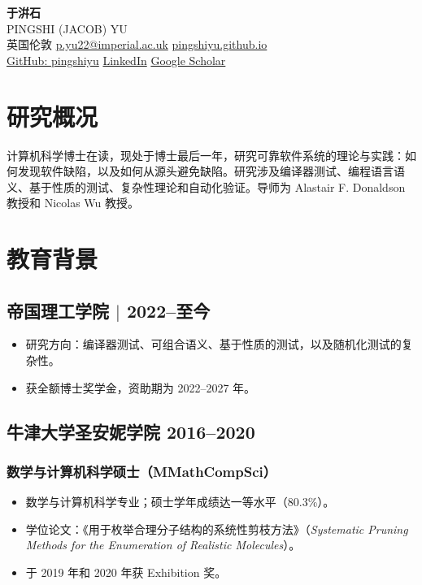 \documentclass[11pt]{article}
\newcommand{\aux}[1]{$|$ \space {\normalfont #1}}
\newcommand{\rside}[1]{\hfill {\normalfont\color{accent} #1}}
\begin{document}
\begin{center}
  {\fontsize{30}{36}\bfseries\color{accent}于洴石}\\[5pt]
  {\large\color{accent}PINGSHI (JACOB) YU}\\[5pt]
  英国伦敦 \quad
  \href{mailto:p.yu22@imperial.ac.uk}{p.yu22@imperial.ac.uk} \quad
  \href{https://pingshiyu.github.io}{pingshiyu.github.io}\\[3pt]
  \href{https://github.com/pingshiyu}{GitHub: pingshiyu} \quad
  \href{https://www.linkedin.com/in/jacob-pingshi-yu/}{LinkedIn} \quad
  \href{https://scholar.google.com/citations?user=hbgX7rEAAAAJ}{Google Scholar}
\end{center}

\section{研究概况}

计算机科学博士在读，现处于博士最后一年，研究可靠软件系统的理论与实践：如何发现软件缺陷，以及如何从源头避免缺陷。研究涉及编译器测试、编程语言语义、基于性质的测试、复杂性理论和自动化验证。导师为 Alastair F. Donaldson 教授和 Nicolas Wu 教授。

\section{教育背景}

\subsection{帝国理工学院 \aux{计算机科学博士在读} \rside{2022--至今}}
\begin{itemize}
  \item 研究方向：编译器测试、可组合语义、基于性质的测试，以及随机化测试的复杂性。
  \item 获全额博士奖学金，资助期为 2022--2027 年。
\end{itemize}

\subsection{牛津大学圣安妮学院 \rside{2016--2020}}
\subsubsection{数学与计算机科学硕士（MMathCompSci）}
\begin{itemize}
  \item 数学与计算机科学专业；硕士学年成绩达一等水平（80.3\%）。
  \item 学位论文：《用于枚举合理分子结构的系统性剪枝方法》（\textit{Systematic Pruning Methods for the Enumeration of Realistic Molecules}）。
  \item 于 2019 年和 2020 年获 Exhibition 奖。
\end{itemize}
\end{document}
